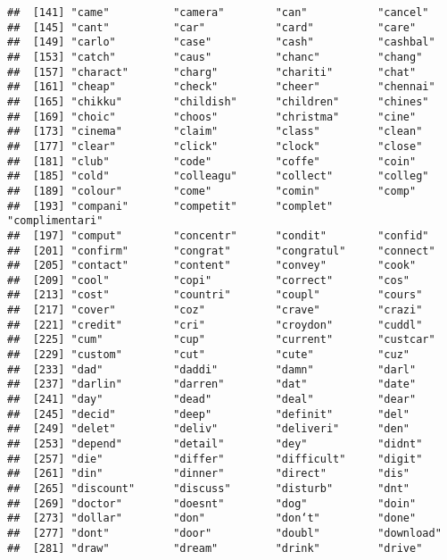 \documentclass[]{article}
\begin{document}
\begin{verbatim}
##  [141] "came"          "camera"        "can"           "cancel"       
##  [145] "cant"          "car"           "card"          "care"         
##  [149] "carlo"         "case"          "cash"          "cashbal"      
##  [153] "catch"         "caus"          "chanc"         "chang"        
##  [157] "charact"       "charg"         "chariti"       "chat"         
##  [161] "cheap"         "check"         "cheer"         "chennai"      
##  [165] "chikku"        "childish"      "children"      "chines"       
##  [169] "choic"         "choos"         "christma"      "cine"         
##  [173] "cinema"        "claim"         "class"         "clean"        
##  [177] "clear"         "click"         "clock"         "close"        
##  [181] "club"          "code"          "coffe"         "coin"         
##  [185] "cold"          "colleagu"      "collect"       "colleg"       
##  [189] "colour"        "come"          "comin"         "comp"         
##  [193] "compani"       "competit"      "complet"       "complimentari"
##  [197] "comput"        "concentr"      "condit"        "confid"       
##  [201] "confirm"       "congrat"       "congratul"     "connect"      
##  [205] "contact"       "content"       "convey"        "cook"         
##  [209] "cool"          "copi"          "correct"       "cos"          
##  [213] "cost"          "countri"       "coupl"         "cours"        
##  [217] "cover"         "coz"           "crave"         "crazi"        
##  [221] "credit"        "cri"           "croydon"       "cuddl"        
##  [225] "cum"           "cup"           "current"       "custcar"      
##  [229] "custom"        "cut"           "cute"          "cuz"          
##  [233] "dad"           "daddi"         "damn"          "darl"         
##  [237] "darlin"        "darren"        "dat"           "date"         
##  [241] "day"           "dead"          "deal"          "dear"         
##  [245] "decid"         "deep"          "definit"       "del"          
##  [249] "delet"         "deliv"         "deliveri"      "den"          
##  [253] "depend"        "detail"        "dey"           "didnt"        
##  [257] "die"           "differ"        "difficult"     "digit"        
##  [261] "din"           "dinner"        "direct"        "dis"          
##  [265] "discount"      "discuss"       "disturb"       "dnt"          
##  [269] "doctor"        "doesnt"        "dog"           "doin"         
##  [273] "dollar"        "don"           "don‘t"         "done"         
##  [277] "dont"          "door"          "doubl"         "download"     
##  [281] "draw"          "dream"         "drink"         "drive"        

\end{verbatim}
\end{document}
